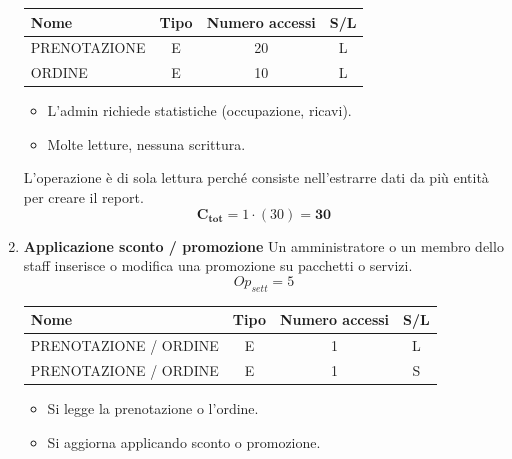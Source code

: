 \documentclass[a4paper,12pt]{report}
\begin{document}
\begin{enumerate}
	      \begin{table}[H]
		      \centering
		      \small
		      \renewcommand{\arraystretch}{1.15}
		      \begin{tabularx}{0.8\textwidth}{|X|c|c|c|}
			      \hline
			      \rowcolor{gray!20}
			      \textbf{Nome} & \textbf{Tipo} & \textbf{Numero accessi} & \textbf{S/L} \\
			      \hline
			      PRENOTAZIONE  & E             & 20                      & L            \\
			      ORDINE        & E             & 10                      & L            \\
			      \hline
		      \end{tabularx}
	      \end{table}

	      \begin{itemize}
		      \item L'admin richiede statistiche (occupazione, ricavi).
		      \item Molte letture, nessuna scrittura.
	      \end{itemize}

	      L'operazione è di sola lettura perché consiste nell'estrarre dati da più entità per creare il report.
	      $$\mathbf{C_{tot}} = 1 \cdot (30) = \mathbf{30}$$


	\item {\large \textbf{Applicazione sconto / promozione}} \label{op17}
	      Un amministratore o un membro dello staff inserisce o modifica una promozione su pacchetti o servizi.
	      $$
		      Op_{sett} = 5
	      $$

	      \begin{table}[H]
		      \centering
		      \small
		      \renewcommand{\arraystretch}{1.15}
		      \begin{tabularx}{0.8\textwidth}{|X|c|c|c|}
			      \hline
			      \rowcolor{gray!20}
			      \textbf{Nome}         & \textbf{Tipo} & \textbf{Numero accessi} & \textbf{S/L} \\
			      \hline
			      PRENOTAZIONE / ORDINE & E             & 1                       & L            \\
			      PRENOTAZIONE / ORDINE & E             & 1                       & S            \\
			      \hline
		      \end{tabularx}
	      \end{table}

	      \begin{itemize}
		      \item Si legge la prenotazione o l'ordine.
		      \item Si aggiorna applicando sconto o promozione.
	      \end{itemize}


\end{enumerate}
\end{document}
